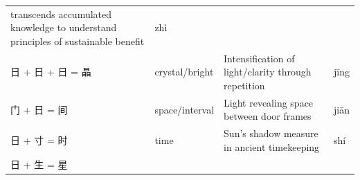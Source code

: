\begin{longtable}[]{@{}llll@{}}
\begin{minipage}[t]{0.33\columnwidth}
transcends accumulated knowledge to understand principles of sustainable
benefit\strut
\end{minipage} & \begin{minipage}[t]{0.19\columnwidth}\raggedright
zhì\strut
\end{minipage}\tabularnewline
\begin{minipage}[t]{0.19\columnwidth}\raggedright
日 + 日 + 日 = 晶\strut
\end{minipage} & \begin{minipage}[t]{0.19\columnwidth}\raggedright
crystal/bright\strut
\end{minipage} & \begin{minipage}[t]{0.33\columnwidth}\raggedright
Intensification of light/clarity through repetition\strut
\end{minipage} & \begin{minipage}[t]{0.19\columnwidth}\raggedright
jīng\strut
\end{minipage}\tabularnewline
\begin{minipage}[t]{0.19\columnwidth}\raggedright
门 + 日 = 间\strut
\end{minipage} & \begin{minipage}[t]{0.19\columnwidth}\raggedright
space/interval\strut
\end{minipage} & \begin{minipage}[t]{0.33\columnwidth}\raggedright
Light revealing space between door frames\strut
\end{minipage} & \begin{minipage}[t]{0.19\columnwidth}\raggedright
jiān\strut
\end{minipage}\tabularnewline
\begin{minipage}[t]{0.19\columnwidth}\raggedright
日 + 寸 = 时\strut
\end{minipage} & \begin{minipage}[t]{0.19\columnwidth}\raggedright
time\strut
\end{minipage} & \begin{minipage}[t]{0.33\columnwidth}\raggedright
Sun's shadow measure in ancient timekeeping\strut
\end{minipage} & \begin{minipage}[t]{0.19\columnwidth}\raggedright
shí\strut
\end{minipage}\tabularnewline
\begin{minipage}[t]{0.19\columnwidth}\raggedright
日 + 生 = 星\strut
\end{minipage} & \begin{minipage}[t]{0.19\columnwidth}\raggedright

\end{minipage}
\end{longtable}
